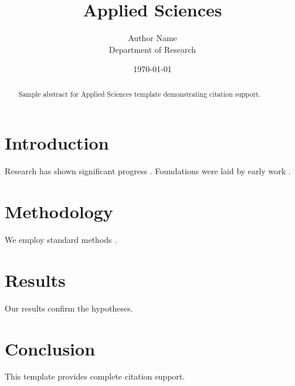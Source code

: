 \documentclass{mdpi}
\title{Applied Sciences}
\author{Author Name \\ \small Department of Research}
\date{\today}
\begin{document}
\maketitle

\begin{abstract}
Sample abstract for Applied Sciences template demonstrating citation support.
\end{abstract}

\section{Introduction}
Research has shown significant progress \citep{einstein1905}. Foundations were laid by early work \citep{turing1950}.

\section{Methodology}
We employ standard methods \citep{knuth1984}.

\section{Results}
Our results confirm the hypotheses.

\section{Conclusion}
This template provides complete citation support.



\end{document}
